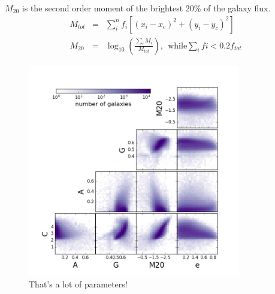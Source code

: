 \documentclass[twocolumn]{aastex6}
\newcommand{\M}[1]{$M_{#1}$}
\begin{document}
\M{20} is the second order moment of the brightest 20\% of the galaxy flux. 
\begin{eqnarray}
 M_{tot} & = & \sum_i^nf_i[(x_i-x_c)^2 + (y_i-y_c)^2]  \\
 M_{20} & = & \log_{10} (\frac{\sum_iM_i}{M_{tot}}), ~~\textrm{while} \sum_ifi < 0.2f_{tot}
\end{eqnarray}


\begin{figure}[t!]
\includegraphics[width=3.65in]{figures/morph_params_entire_GZ2_sample.png}
\caption{That's a lot of parameters! \label{fig: machine classified}}
\end{figure}



\end{document}
